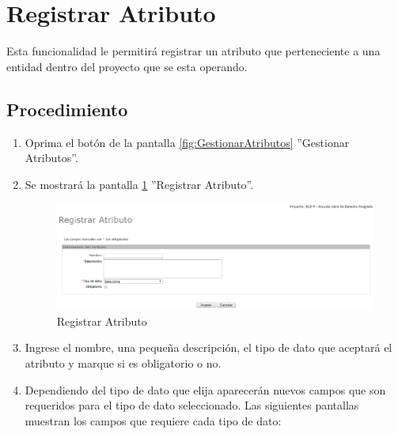 
\hypertarget{cv:registrarAtributo}{\section{Registrar Atributo}} \label{sec:registrarAtributo}

	Esta funcionalidad le permitirá registrar un atributo que perteneciente a una entidad dentro del proyecto que se esta operando. 

		\subsection{Procedimiento}

			\begin{enumerate}
	
			\item Oprima el botón \IURegistrar{} de la pantalla \ref{fig:GestionarAtributos} ''Gestionar Atributos''.
			
			\item Se mostrará la pantalla \ref{fig:registrarAtributo} ''Registrar Atributo''.

			\begin{figure}[H]
				\begin{center}
					\includegraphics[scale=0.5]{roles/lider/entidades/atributos/pantallas/IU12-1-1registrarAtributo}
					\caption{Registrar Atributo}
					\label{fig:registrarAtributo}
				\end{center}
			\end{figure}
		
			\item Ingrese el nombre, una pequeña descripción, el tipo de dato que aceptará el atributo y marque si es obligatorio o no.
			
			\item Dependiendo del tipo de dato que elija aparecerán nuevos campos que son requeridos para el tipo de dato seleccionado. Las siguientes pantallas muestran los campos que requiere cada tipo de dato:
			

\end{enumerate}
